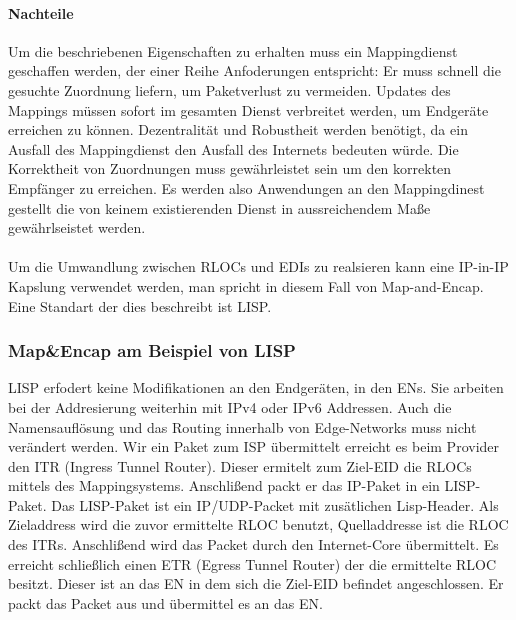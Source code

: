 \paragraph{Nachteile}
Um die beschriebenen Eigenschaften zu erhalten muss ein Mappingdienst geschaffen werden, der einer Reihe Anfoderungen entspricht: Er muss schnell die gesuchte Zuordnung liefern, um Paketverlust zu vermeiden. Updates des Mappings müssen sofort im gesamten Dienst verbreitet werden, um Endgeräte erreichen zu können. Dezentralität und Robustheit werden benötigt, da ein Ausfall des Mappingdienst den Ausfall des Internets bedeuten würde. Die Korrektheit von Zuordnungen muss gewährleistet sein um den korrekten Empfänger zu erreichen. Es werden also Anwendungen an den Mappingdinest gestellt die von keinem existierenden Dienst in aussreichendem Maße gewährlseistet werden.

\paragraph{} %
Um die Umwandlung zwischen RLOCs und EDIs zu realsieren kann eine IP-in-IP Kapslung verwendet werden, man spricht in diesem Fall von Map-and-Encap. Eine Standart der dies beschreibt ist LISP. 

\subsubsection{Map\&Encap am Beispiel von LISP}
LISP erfodert keine Modifikationen an den Endgeräten, in den ENs. Sie arbeiten bei der Addresierung weiterhin mit IPv4 oder IPv6 Addressen. Auch die Namensauflösung und das Routing innerhalb von Edge-Networks muss nicht verändert werden. Wir ein Paket zum ISP übermittelt erreicht es beim Provider den ITR (Ingress Tunnel Router). Dieser ermitelt zum Ziel-EID die RLOCs mittels des Mappingsystems. Anschlißend packt er das IP-Paket in ein LISP-Paket. Das LISP-Paket ist ein IP/UDP-Packet mit zusätlichen Lisp-Header. Als Zieladdress wird die zuvor ermittelte RLOC benutzt, Quelladdresse ist die RLOC des ITRs. Anschlißend wird das Packet durch den Internet-Core übermittelt. Es erreicht schließlich einen ETR (Egress Tunnel Router) der die ermittelte RLOC besitzt. Dieser ist an das EN in dem sich die Ziel-EID befindet angeschlossen. Er packt das Packet aus und übermittel es an das EN. \\

